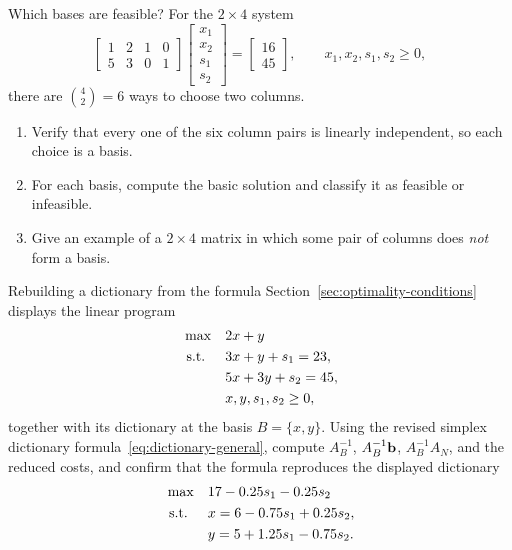 \begin{ex}{Which bases are feasible?}{}
\label{ex:matrix-feasible-bases}
 For the \( 2 \times 4 \) system
\[
\begin{bmatrix}
    1 & 2 & 1 & 0 \\
    5 & 3 & 0 & 1
\end{bmatrix}
\begin{bmatrix}
    x_1 \\ x_2 \\ s_1 \\ s_2
\end{bmatrix}
=
\begin{bmatrix}
    16 \\ 45
\end{bmatrix},
\qquad x_1, x_2, s_1, s_2 \geq 0,
\]
there are \( \binom{4}{2} = 6 \) ways to choose two columns.
\begin{enumerate}
    \item Verify that every one of the six column pairs is linearly independent, so each choice is a basis.
    \item For each basis, compute the basic solution and classify it as feasible or infeasible.
    \item Give an example of a \( 2 \times 4 \) matrix in which some pair of columns does \emph{not} form a basis.
\end{enumerate}
\end{ex}

\begin{ex}{Rebuilding a dictionary from the formula}{}
\label{ex:matrix-dictionary-formula}
 Section~\ref{sec:optimality-conditions} displays the linear program
\[
\begin{aligned}
\max\quad & 2x + y \\
\text{ s.t. }\quad & 3x + y + s_1 = 23,\\
& 5x + 3y + s_2 = 45,\\
& x, y, s_1, s_2 \ge 0,
\end{aligned}
\]
together with its dictionary at the basis \( B = \{x, y\} \).  Using the revised simplex dictionary formula~\eqref{eq:dictionary-general}, compute \( A_B^{-1} \), \( A_B^{-1}\mathbf{b} \), \( A_B^{-1}A_N \), and the reduced costs, and confirm that the formula reproduces the displayed dictionary
\[
\begin{aligned}
\max\quad & 17 - 0.25s_1 - 0.25s_2 \\
\text{ s.t. }\quad & x = 6 - 0.75s_1 + 0.25s_2,\\
& y = 5 + 1.25s_1 - 0.75s_2.
\end{aligned}
\]
\exrefs{\S\ref{sec:optimality-conditions}}
\end{ex}

